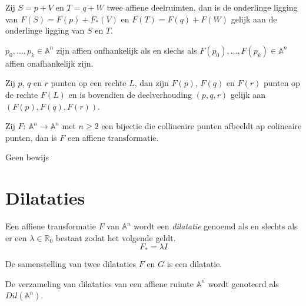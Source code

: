 \documentclass[main.tex]{subfiles}
\begin{document}
\begin{st}
  Zij $S= p+V$ en $T= q+W$ twee affiene deelruimten, dan is de onderlinge ligging van $F(S) = F(p) + F_{*}(V)$ en $F(T) = F(q) + F(W)$ gelijk aan de onderlinge ligging van $S$ en $T$.  

\end{st}

\begin{st}
  $p_{0},\dotsc,p_{k} \in \mathbb{A}^{n}$ zijn affien onfhankelijk als en slechs als $F(p_{0}),\dotsc,F(p_{k}) \in \mathbb{A}^{n}$ affien onafhankelijk zijn.

\end{st}


\begin{st}
  Zij $p$, $q$ en $r$ punten op een rechte $L$, dan zijn $F(p)$, $F(q)$ en $F(r)$ punten op de rechte $F(L)$ en is bovendien de deelverhouding $(p,q,r)$ gelijk aan $(F(p),F(q),F(r))$.

\end{st}

\begin{st}
  Zij $F:\ \mathbb{A}^{n} \rightarrow \mathbb{A}^{n}$ met $n\ge 2$ een bijectie die collineaire punten afbeeldt ap colineaire punten, dan is $F$ een affiene transformatie.

Geen bewijs
\end{st}

\section{Dilataties}
\label{sec:dilataties}

\begin{de}
  Een affiene transformatie $F$ van $\mathbb{A}^{n}$ wordt een \emph{dilatatie} genoemd als en slechts als er een $\lambda\in \mathbb{R}_{0}$ bestaat zodat het volgende geldt.
  \[ F_{*} = \lambda I \]
\end{de}

\begin{st}
  De samenstelling van twee dilataties $F$ en $G$ is een dilatatie.

\end{st}

\begin{de}
  De verzameling van dilataties van een affiene ruimte $\mathbb{A}^{n}$ wordt genoteerd als $Dil(\mathbb{A}^{n})$.
\end{de}
\end{document}
